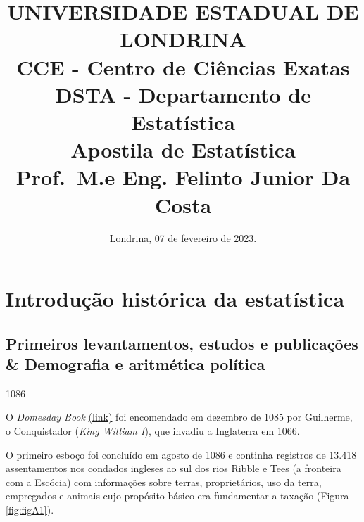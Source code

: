 \documentclass[
]{book}
\title{UNIVERSIDADE ESTADUAL DE LONDRINA\\
CCE - Centro de Ciências Exatas\\
DSTA - Departamento de Estatística\\
Apostila de Estatística\\
Prof.~M.e Eng. Felinto Junior Da Costa}
\author{}
\date{\vspace{-2.5em}Londrina, 07 de fevereiro de 2023.}
\begin{document}
\maketitle

{
\setcounter{tocdepth}{1}
\tableofcontents
}
\hypertarget{section}{%
\chapter*{}\label{section}}

\hypertarget{introduuxe7uxe3o-histuxf3rica-da-estatuxedstica}{%
\chapter{Introdução histórica da estatística}\label{introduuxe7uxe3o-histuxf3rica-da-estatuxedstica}}

\hypertarget{primeiros-levantamentos-estudos-e-publicauxe7uxf5es-demografia-e-aritmuxe9tica-poluxedtica}{%
\section{Primeiros levantamentos, estudos e publicações \& Demografia e aritmética política}\label{primeiros-levantamentos-estudos-e-publicauxe7uxf5es-demografia-e-aritmuxe9tica-poluxedtica}}

1086

\hfill\break

O \emph{Domesday Book} \href{http://www.nationalarchives.gov.uk/education/resources/domesday-book/}{(link)}
foi encomendado em dezembro de 1085 por Guilherme, o Conquistador (\emph{King William I}), que invadiu a Inglaterra em 1066.

O primeiro esboço foi concluído em agosto de 1086 e continha registros de 13.418 assentamentos nos condados ingleses ao sul dos rios Ribble e Tees (a fronteira com a Escócia) com informações sobre terras, proprietários, uso da terra, empregados e animais cujo propósito básico era fundamentar a taxação (Figura \ref{fig:figA1}).

\hfill\break
\end{document}
